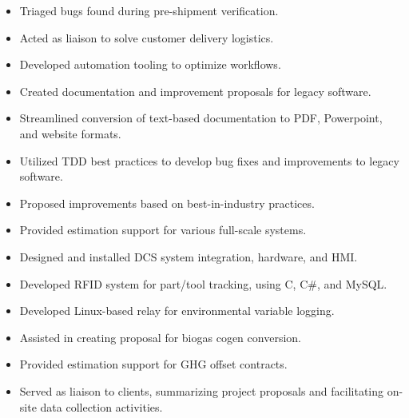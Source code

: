 \documentclass[a4paper,ragged2e,withhyper]{altacv}
\begin{document}
\divider

\begin{itemize}
\item Triaged bugs found during pre-shipment verification.
\item Acted as liaison to solve customer delivery logistics.
\item Developed automation tooling to optimize workflows.
\item Created documentation and improvement proposals for legacy software.
\item Streamlined conversion of text-based documentation to PDF, Powerpoint, and website formats.
\item Utilized TDD best practices to develop bug fixes and improvements to legacy software.
\end{itemize}

\divider

\begin{itemize}
\item Proposed improvements based on best-in-industry practices.
\item Provided estimation support for various full-scale systems.
\item Designed and installed DCS system integration, hardware, and HMI.
\item Developed RFID system for part/tool tracking, using C, C\#, and MySQL.
\end{itemize}

\divider

\begin{itemize}
\item Developed Linux-based relay for environmental variable logging.
\item Assisted in creating proposal for biogas cogen conversion.
\item Provided estimation support for GHG offset contracts.
\item Served as liaison to clients, summarizing project proposals and facilitating on-site data collection activities.
\end{itemize}
\end{document}
